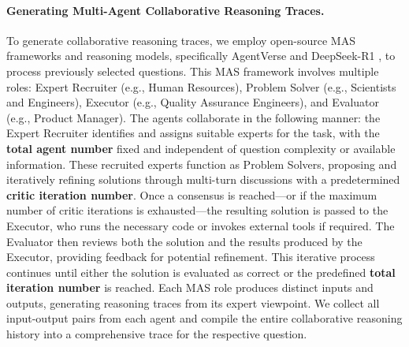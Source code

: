 \paragraph{Generating Multi-Agent Collaborative Reasoning Traces.}
To generate collaborative reasoning traces, we employ open-source MAS frameworks and reasoning models, specifically AgentVerse \citep{agentverse} and DeepSeek-R1 \citep{r1}, to process previously selected questions. This MAS framework involves multiple roles: Expert Recruiter (e.g., Human Resources), Problem Solver (e.g., Scientists and Engineers), Executor (e.g., Quality Assurance Engineers), and Evaluator (e.g., Product Manager). The agents collaborate in the following manner: the Expert Recruiter identifies and assigns suitable experts for the task, with the \textbf{total agent number} fixed and independent of question complexity or available information. These recruited experts function as Problem Solvers, proposing and iteratively refining solutions through multi-turn discussions with a predetermined \textbf{critic iteration number}. Once a consensus is reached—or if the maximum number of critic iterations is exhausted—the resulting solution is passed to the Executor, who runs the necessary code or invokes external tools if required. The Evaluator then reviews both the solution and the results produced by the Executor, providing feedback for potential refinement. This iterative process continues until either the solution is evaluated as correct or the predefined \textbf{total iteration number} is reached. Each MAS role produces distinct inputs and outputs, generating reasoning traces from its expert viewpoint. We collect all input-output pairs from each agent and compile the entire collaborative reasoning history into a comprehensive trace for the respective question.


